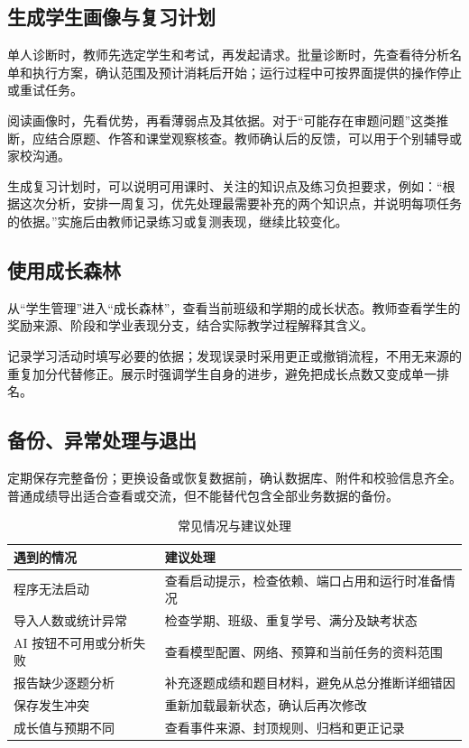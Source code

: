 \documentclass[11pt,a4paper,fontset=none]{ctexart}
\begin{document}
\subsection{生成学生画像与复习计划}

单人诊断时，教师先选定学生和考试，再发起请求。批量诊断时，先查看待分析名单和执行方案，确认范围及预计消耗后开始；运行过程中可按界面提供的操作停止或重试任务。

阅读画像时，先看优势，再看薄弱点及其依据。对于“可能存在审题问题”这类推断，应结合原题、作答和课堂观察核查。教师确认后的反馈，可以用于个别辅导或家校沟通。

生成复习计划时，可以说明可用课时、关注的知识点及练习负担要求，例如：“根据这次分析，安排一周复习，优先处理最需要补充的两个知识点，并说明每项任务的依据。”实施后由教师记录练习或复测表现，继续比较变化。

\subsection{使用成长森林}

从“学生管理”进入“成长森林”，查看当前班级和学期的成长状态。教师查看学生的奖励来源、阶段和学业表现分支，结合实际教学过程解释其含义。

记录学习活动时填写必要的依据；发现误录时采用更正或撤销流程，不用无来源的重复加分代替修正。展示时强调学生自身的进步，避免把成长点数又变成单一排名。

\subsection{备份、异常处理与退出}

定期保存完整备份；更换设备或恢复数据前，确认数据库、附件和校验信息齐全。普通成绩导出适合查看或交流，但不能替代包含全部业务数据的备份。

\begin{table}[htbp]
\centering
\small
\begin{tabularx}{\textwidth}{@{}L{5.4cm}Y@{}}
\toprule
\textbf{遇到的情况} & \textbf{建议处理} \\
\midrule
程序无法启动 & 查看启动提示，检查依赖、端口占用和运行时准备情况 \\
导入人数或统计异常 & 检查学期、班级、重复学号、满分及缺考状态 \\
AI 按钮不可用或分析失败 & 查看模型配置、网络、预算和当前任务的资料范围 \\
报告缺少逐题分析 & 补充逐题成绩和题目材料，避免从总分推断详细错因 \\
保存发生冲突 & 重新加载最新状态，确认后再次修改 \\
成长值与预期不同 & 查看事件来源、封顶规则、归档和更正记录 \\
\bottomrule
\end{tabularx}
\caption{常见情况与建议处理}
\end{table}
\end{document}
